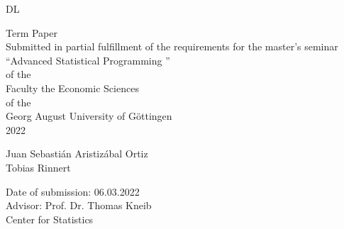 \begin{titlepage}
\vspace*{3.5cm}
\centering
{\LARGE DL}\\[2\baselineskip]
{\LARGE  Term Paper  \\
 Submitted in partial fulfillment of the requirements for the  master's seminar\\
\textquotedblleft Advanced Statistical Programming \textquotedblright\ \\
of the \\
Faculty the Economic Sciences \\
of the \\
Georg August University of Göttingen\\
2022 \par}
\vspace*{\fill}
\begin{flushleft}
Juan Sebastián Aristizábal Ortiz\\
Tobias Rinnert

Date of submission: 06.03.2022\\
\vspace{10mm}
Advisor: Prof. Dr. Thomas Kneib\\
Center for Statistics\\
\end{flushleft}
\thispagestyle{empty}
\end{titlepage}
